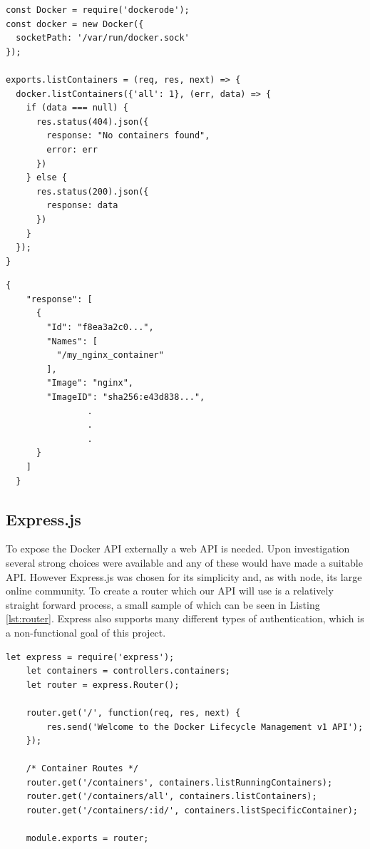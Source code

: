 \begin{lstlisting}[caption={Listing All Containers on a Host},label={lst:dockerode}]
const Docker = require('dockerode');
const docker = new Docker({
  socketPath: '/var/run/docker.sock'
});

exports.listContainers = (req, res, next) => {
  docker.listContainers({'all': 1}, (err, data) => {
    if (data === null) {
      res.status(404).json({
        response: "No containers found",
        error: err
      })
    } else {
      res.status(200).json({
        response: data
      })
    }
  });
}
\end{lstlisting}

\begin{lstlisting}[caption={Response From Server},label={lst:response}]
  {
    "response": [
      {
        "Id": "f8ea3a2c0...",
        "Names": [
          "/my_nginx_container"
        ],
        "Image": "nginx",
        "ImageID": "sha256:e43d838...",
                .
                .
                .
      }
    ]
  }
\end{lstlisting}

\subsection{Express.js}
\label{sub:express}

To expose the Docker API externally a web API is needed. Upon investigation several strong choices were available and any of these would have made a suitable API. However Express.js was chosen for its simplicity and, as with node, its large online community. To create a router which our API will use is a relatively straight forward process, a small sample of which can be seen in Listing \ref{lst:router}. Express also supports many different types of authentication, which is a non-functional goal of this project. 

\begin{lstlisting}[caption={Creating an Express.js Router},label={lst:router}]
	let express	= require('express');
	let containers = controllers.containers;
	let router = express.Router();

	router.get('/', function(req, res, next) {
	    res.send('Welcome to the Docker Lifecycle Management v1 API');
	});

	/* Container Routes */
	router.get('/containers', containers.listRunningContainers);
	router.get('/containers/all', containers.listContainers);
	router.get('/containers/:id/', containers.listSpecificContainer);

	module.exports = router;
\end{lstlisting}


